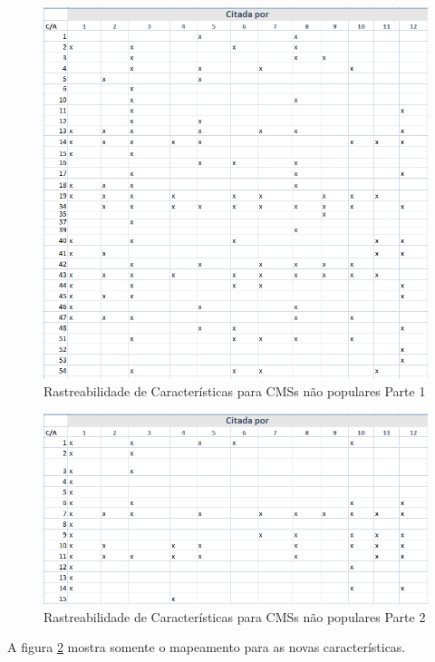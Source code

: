 \begin{apendicesenv}
\begin{figure}[h]
\centering
\includegraphics[keepaspectratio=true,scale=0.70]{figuras/Figura_3.png}
\caption{Rastreabilidade de Características para CMSs não populares Parte 1}
\label{Rastreabuilidade_Não_Popular_3}
\end{figure}



\begin{figure}[h]
\centering
\includegraphics[keepaspectratio=true,scale=0.65]{figuras/Figura_4.png}
\caption{Rastreabilidade de Características para CMSs não populares Parte 2}
\label{Rastreabuilidade_Não_Popular_4}
\end{figure}

A figura \ref{Rastreabuilidade_Não_Popular_4} mostra somente o mapeamento para as novas características.


\end{apendicesenv}
